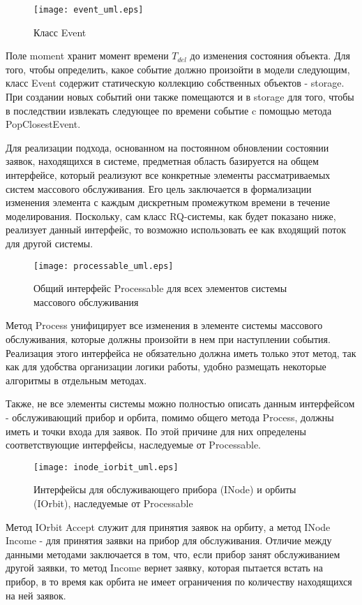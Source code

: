 \begin{figure}[H]
	\centering
	\texttt{[image: event\_uml.eps]}
	\caption{Класс Event}
	\label{event_uml}
\end{figure}
Поле moment хранит момент времени $T_{del}$ до изменения состояния объекта. Для того, чтобы определить, какое событие должно произойти в модели следующим, класс Event содержит статическую коллекцию собственных объектов - storage. При создании новых событий они также помещаются и в storage для того, чтобы в последствии извлекать следующее по времени событие c помощью метода PopClosestEvent.

Для реализации подхода, основанном на постоянном обновлении состоянии заявок, находящихся в системе, предметная область базируется на общем интерфейсе, который реализуют все конкретные элементы рассматриваемых систем массового обслуживания. Его цель заключается в формализации изменения элемента  с каждым дискретным промежутком времени в течение моделирования. Поскольку, сам класс RQ-системы, как будет показано ниже, реализует данный интерфейс, то возможно использовать ее как входящий поток для другой системы.
\begin{figure}[H]
	\centering
	\texttt{[image: processable\_uml.eps]}
	\caption{Общий интерфейс Processable для всех элементов системы массового обслуживания}
	\label{processable_uml}
\end{figure}
Метод Process унифицирует все изменения в элементе системы массового обслуживания, которые должны произойти в нем при наступлении события. Реализация этого интерфейса не обязательно должна иметь только этот метод, так как для удобства организации логики работы, удобно размещать некоторые алгоритмы в отдельным методах.

Также, не все элементы системы можно полностью описать данным интерфейсом - обслуживающий прибор и орбита, помимо общего метода Process, должны иметь и точки входа для заявок. По этой причине для них определены соответствующие интерфейсы, наследуемые от Processable.
\begin{figure}[H]
	\centering
	\texttt{[image: inode\_iorbit\_uml.eps]}
	\caption{Интерфейсы для обслуживающего прибора (INode) и орбиты (IOrbit), наследуемые от Processable}
	\label{inode_iorbit_uml}
\end{figure}
Метод IOrbit Accept служит для принятия заявок на орбиту, а метод INode Income - для принятия заявки на прибор для обслуживания. Отличие между данными методами заключается в том, что, если прибор занят обслуживанием другой заявки, то метод Income вернет заявку, которая пытается встать на прибор, в то время как орбита не имеет ограничения по количеству находящихся на ней заявок.


